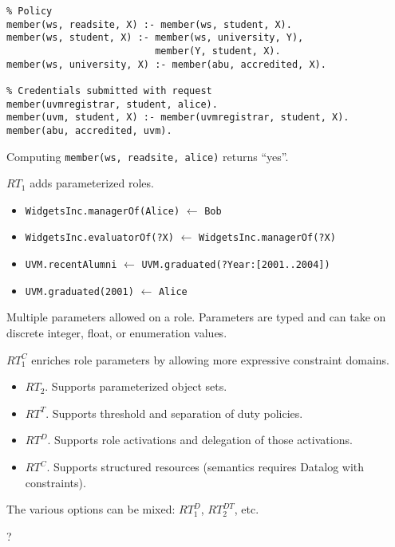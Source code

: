 \documentclass[landscape]{slides}
\begin{document}
\stopslide



\begin{verbatim}
% Policy
member(ws, readsite, X) :- member(ws, student, X).
member(ws, student, X) :- member(ws, university, Y),
                          member(Y, student, X).
member(ws, university, X) :- member(abu, accredited, X).

% Credentials submitted with request
member(uvmregistrar, student, alice).
member(uvm, student, X) :- member(uvmregistrar, student, X).
member(abu, accredited, uvm).
\end{verbatim}

Computing \texttt{member(ws, readsite, alice)} returns ``yes''.

\stopslide



$RT_1$ adds parameterized roles.

\begin{itemize}

\item \texttt{WidgetsInc.managerOf(Alice)} $\leftarrow$ \texttt{Bob}
\item \texttt{WidgetsInc.evaluatorOf(?X)} $\leftarrow$ \texttt{WidgetsInc.managerOf(?X)}
\item \texttt{UVM.recentAlumni} $\leftarrow$ \texttt{UVM.graduated(?Year:[2001..2004])}
\item \texttt{UVM.graduated(2001)} $\leftarrow$ \texttt{Alice}
\end{itemize}

Multiple parameters allowed on a role. Parameters are typed and can take on discrete integer, float, or enumeration values.

$RT_1^C$ enriches role parameters by allowing more expressive constraint domains.

\stopslide



\begin{itemize}
\item $RT_2$. Supports parameterized object sets.
\item $RT^T$. Supports threshold and separation of duty policies. 
\item $RT^D$. Supports role activations and delegation of those activations.
\item $RT^C$. Supports structured resources (semantics requires Datalog with constraints).
\end{itemize}

The various options can be mixed: $RT_1^D$, $RT_2^{DT}$, etc.

\stopslide



\begin{center}\Large ?\end{center}

\stopslide
\end{document}
